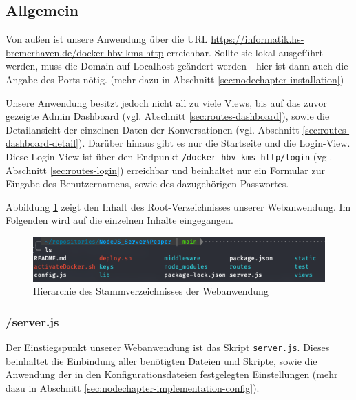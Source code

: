 \subsection{Allgemein}
Von außen ist unsere Anwendung über die URL
\href{https://informatik.hs-bremerhaven.de/docker-hbv-kms-http}{https://informatik.hs-bremerhaven.de/docker-hbv-kms-http}
erreichbar. Sollte sie lokal ausgeführt werden, muss die Domain auf Localhost geändert werden - hier ist dann auch die Angabe
des Ports nötig. (mehr dazu in Abschnitt \ref{sec:nodechapter-installation})


Unsere Anwendung besitzt jedoch nicht all zu viele Views, bis auf das zuvor gezeigte Admin Dashboard (vgl. Abschnitt \ref{sec:routes-dashboard}), sowie
die Detailansicht der einzelnen Daten der Konversationen (vgl. Abschnitt \ref{sec:routes-dashboard-detail}). Darüber hinaus gibt es nur
die Startseite und die Login-View. Diese Login-View ist über den Endpunkt \verb|/docker-hbv-kms-http/login|
(vgl. Abschnitt \ref{sec:routes-login}) erreichbar und beinhaltet nur ein Formular zur Eingabe des
Benutzernamens, sowie des dazugehörigen Passwortes.


Abbildung \ref{fig:webhierarchie} zeigt den Inhalt des Root-Verzeichnisses unserer Webanwendung.
Im Folgenden wird auf die einzelnen Inhalte eingegangen. \\

\begin{figure}[H]
    \includegraphics[width=\textwidth]{Figures/NodeChapter/ServerFileStructure.png}
    \caption{Hierarchie des Stammverzeichnisses der Webanwendung}
    \label{fig:webhierarchie}
    \centering
\end{figure}

\subsubsection*{/server.js}
Der Einstiegspunkt unserer Webanwendung ist das Skript \verb|server.js|. Dieses beinhaltet die Einbindung aller
benötigten Dateien und Skripte, sowie die Anwendung der in den Konfigurationsdateien festgelegten Einstellungen
(mehr dazu in Abschnitt \ref{sec:nodechapter-implementation-config}).

